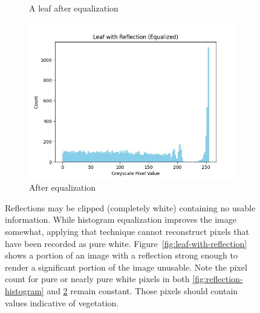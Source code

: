 \documentclass[letterpaper]{article}
\begin{document}
{\begin{figure}[h]
\begin{subfigure}[t]{.24\textwidth}
	  \caption{A leaf after equalization}
	  \label{fig:leaf-equalized}
	\end{subfigure}
	\begin{subfigure}[t]{.24\textwidth}
	  \centering
	  \includegraphics[width=.8\textwidth]{figures/reflection-histogram-equalized.jpg}
	  \caption{After equalization}
	  \label{fig:leaf-equalized-histogram}
	\end{subfigure}
	\caption[Reflection problems in segmented vegetation]{Reflections may be clipped (completely white) containing no usable information. While histogram equalization improves the image somewhat, applying that technique cannot reconstruct pixels that have been recorded as pure white. Figure~\ref{fig:leaf-with-reflection} shows a portion of an image with a reflection strong enough to render a significant portion of the image unusable. Note the pixel count for pure or nearly pure white pixels in both \ref{fig:reflection-histogram} and \ref{fig:leaf-equalized-histogram} remain constant.  Those pixels should contain values indicative of vegetation.}
	\label{fig:reflection}
\end{figure}



}
\end{document}
